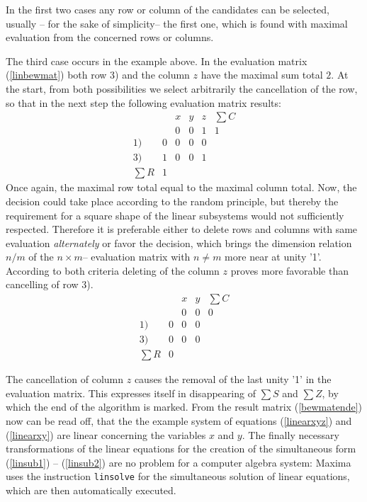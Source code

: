 In the first two cases any row or column of the candidates can be selected, usually -- for the sake of simplicity-- the first one, which is found with maximal evaluation from the concerned rows or columns.

The third case occurs in the example above. In the evaluation matrix (\ref{linbewmat})  both  row 3) and the column $z$ have  the maximal sum total $2$. At the start, from both possibilities we select arbitrarily the cancellation of the row, so that in the next step the following evaluation matrix results:
\begin{equation}
\begin{array}{rr|rrr|c}
       &   & x & y & z & \sum C\\
       &   & 0 & 0 & 1 &    1  \\
\hline
  1)   & 0 & 0 & 0 & 0 &       \\
  3)   & 1 & 0 & 0 & 1 &       \\
\hline
\sum R & 1 &   &   &   &
\end{array}
\end{equation}
Once again, the maximal row total equal to the maximal column total. Now, the decision could take place according to the random principle, but thereby the requirement for a square shape of the linear subsystems would not sufficiently respected. Therefore it is preferable either to delete rows and columns with same evaluation \emph{alternately}  or favor the decision, which brings the dimension relation $n/m$ of the $n \times m$-- evaluation matrix with $n \neq m$ more near at unity '1'. According to both criteria deleting of the column $z$ proves more favorable than  cancelling of  row 3).
\begin{equation} \label{bewmatende}
\begin{array}{rr|rr|c}
       &   & x & y & \sum C \\
       &   & 0 & 0 &    0   \\
\hline
  1)   & 0 & 0 & 0 &        \\
  3)   & 0 & 0 & 0 &        \\
\hline
\sum R & 0 &   &   & 
\end{array}
\end{equation}

The cancellation of column $z$ causes the removal of the last unity '1' in the evaluation matrix. This expresses itself in disappearing of $\sum S$ and $\sum Z$, by which the end of the algorithm is marked. From the result matrix (\ref{bewmatende})  now can be  read off, that the the example system of equations  (\ref{linearxyz})  and (\ref{linearxy})  are linear concerning the variables $x$ and $y$. The finally necessary transformations of the linear equations for the creation of the simultaneous form (\ref{linsub1}) -- (\ref{linsub2}) are no problem for a computer algebra system:  Maxima uses the instruction \verb+linsolve+ for the simultaneous solution of linear equations, which are then automatically executed.

